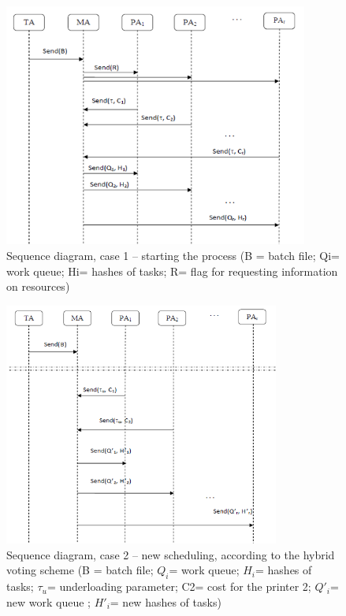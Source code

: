 \begin{figure}[h]
    \centering
    \includegraphics[height=8cm, keepaspectratio]{images/sequence-diagram-case1}
    \caption{Sequence diagram, case 1 – starting the process (B = batch file; Qi= work queue; Hi= hashes of tasks; R= flag for requesting information on resources)}
    \label{fig:seq-diag-case1}
\end{figure}
\begin{figure}[h]
    \centering
    \includegraphics[height=8cm, keepaspectratio]{images/sequence-diagram-case2}
    \caption{Sequence diagram, case 2 – new scheduling, according to the hybrid voting scheme (B = batch file; $Q_i$= work queue; $H_i$= hashes of tasks; $\tau_u$= underloading parameter; C2= cost for the printer 2; $Q\prime_i$= new work queue ; $H\prime_i$= new hashes of tasks)}
    \label{fig:seq-diag-case2}
\end{figure}

